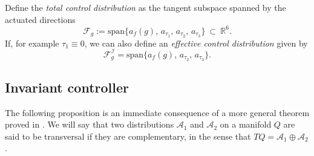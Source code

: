 \documentclass[letterpaper, 10 pt, conference]{ieeeconf}
\begin{document}
Define the \emph{total control distribution} as the tangent subspace spanned by the actuated directions
\begin{equation}\label{eq:F_xi_def}
\mathcal{F}_{g} := \mathrm{span}\Big\{a_f(g),\, a_{\tau_1},\,a_{\tau_2},\,a_{\tau_3}\Big\}
\ \subset\ \mathbb{R}^6.
\end{equation}
If, for example $\tau_1\equiv 0$, we can also define an \textit{effective control distribution} given by
\begin{equation}\label{eq:F_xi_tau1zero}
\mathcal{F}_{g}^{\mathcal{I}}=\mathrm{span}\big\{a_f(g),\,a_{\tau_2},\,a_{\tau_3}\big\}.
\end{equation}



\subsection{Invariant controller}
\label{controller:section}

The following proposition is an immediate consequence of a more general theorem proved in \cite{Simoes:linear:nonholonomic}. We will say that two distributions $\mathcal{A}_{1}$ and $\mathcal{A}_{2}$ on a manifold $Q$ are said to be transversal if they are complementary, in the sense that $TQ=\mathcal{A}_{1}\oplus\mathcal{A}_{2}$.
\end{document}
